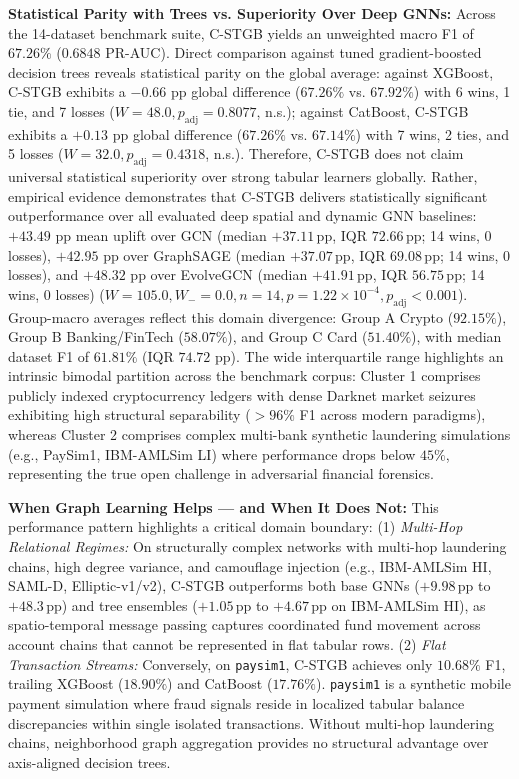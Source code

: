 \textbf{Statistical Parity with Trees vs. Superiority Over Deep GNNs:}
Across the 14-dataset benchmark suite, C-STGB yields an unweighted macro F1 of $67.26\%$ ($0.6848$ PR-AUC). Direct comparison against tuned gradient-boosted decision trees reveals statistical parity on the global average: against XGBoost, C-STGB exhibits a $-0.66\text{ pp}$ global difference ($67.26\%$ vs. $67.92\%$) with 6 wins, 1 tie, and 7 losses ($W=48.0, p_{\text{adj}}=0.8077$, n.s.); against CatBoost, C-STGB exhibits a $+0.13\text{ pp}$ global difference ($67.26\%$ vs. $67.14\%$) with 7 wins, 2 ties, and 5 losses ($W=32.0, p_{\text{adj}}=0.4318$, n.s.). Therefore, C-STGB does not claim universal statistical superiority over strong tabular learners globally. Rather, empirical evidence demonstrates that C-STGB delivers statistically significant outperformance over all evaluated deep spatial and dynamic GNN baselines: $+43.49\text{ pp}$ mean uplift over GCN (median $+37.11$\,pp, IQR $72.66$\,pp; 14 wins, 0 losses), $+42.95\text{ pp}$ over GraphSAGE (median $+37.07$\,pp, IQR $69.08$\,pp; 14 wins, 0 losses), and $+48.32\text{ pp}$ over EvolveGCN (median $+41.91$\,pp, IQR $56.75$\,pp; 14 wins, 0 losses) ($W=105.0, W_- = 0.0, n=14, p = 1.22 \times 10^{-4}, p_{\text{adj}} < 0.001$). Group-macro averages reflect this domain divergence: Group A Crypto ($92.15\%$), Group B Banking/FinTech ($58.07\%$), and Group C Card ($51.40\%$), with median dataset F1 of $61.81\%$ (IQR $74.72\text{ pp}$). The wide interquartile range highlights an intrinsic bimodal partition across the benchmark corpus: Cluster 1 comprises publicly indexed cryptocurrency ledgers with dense Darknet market seizures exhibiting high structural separability ($>96\%$ F1 across modern paradigms), whereas Cluster 2 comprises complex multi-bank synthetic laundering simulations (e.g., PaySim1, IBM-AMLSim LI) where performance drops below $45\%$, representing the true open challenge in adversarial financial forensics.

\textbf{When Graph Learning Helps — and When It Does Not:} This performance pattern highlights a critical domain boundary: (1) \textit{Multi-Hop Relational Regimes:} On structurally complex networks with multi-hop laundering chains, high degree variance, and camouflage injection (e.g., IBM-AMLSim HI, SAML-D, Elliptic-v1/v2), C-STGB outperforms both base GNNs ($+9.98$\,pp to $+48.3$\,pp) and tree ensembles ($+1.05$\,pp to $+4.67$\,pp on IBM-AMLSim HI), as spatio-temporal message passing captures coordinated fund movement across account chains that cannot be represented in flat tabular rows. (2) \textit{Flat Transaction Streams:} Conversely, on \texttt{paysim1}, C-STGB achieves only $10.68\%$ F1, trailing XGBoost ($18.90\%$) and CatBoost ($17.76\%$). \texttt{paysim1} is a synthetic mobile payment simulation where fraud signals reside in localized tabular balance discrepancies within single isolated transactions. Without multi-hop laundering chains, neighborhood graph aggregation provides no structural advantage over axis-aligned decision trees.

